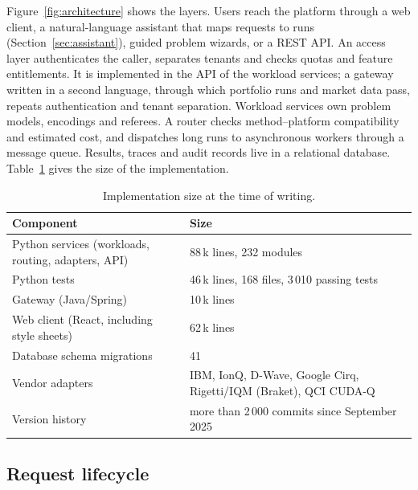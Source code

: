 \documentclass[11pt,a4paper]{article}
\begin{document}
Figure~\ref{fig:architecture} shows the layers. Users reach the platform
through a web client, a natural-language assistant that maps requests to runs
(Section~\ref{sec:assistant}), guided problem wizards, or a REST API. An
access layer authenticates the caller, separates tenants and checks quotas
and feature entitlements. It is implemented in the API of the workload
services; a gateway written in a second language, through which portfolio
runs and market data pass, repeats authentication and tenant separation.
Workload services own problem models, encodings and referees. A
router checks method--platform compatibility and estimated cost, and dispatches
long runs to asynchronous workers through a message queue. Results, traces and
audit records live in a relational database. Table~\ref{tab:codebase} gives the
size of the implementation.

\begin{table}[H]
\centering\small
\begin{tabular}{lp{7.0cm}}
\toprule
Component & Size \\
\midrule
Python services (workloads, routing, adapters, API) & 88\,k lines, 232 modules \\
Python tests & 46\,k lines, 168 files, 3\,010 passing tests \\
Gateway (Java/Spring) & 10\,k lines \\
Web client (React, including style sheets) & 62\,k lines \\
Database schema migrations & 41 \\
Vendor adapters & IBM, IonQ, D-Wave, Google Cirq, Rigetti/IQM (Braket), QCI CUDA-Q \\
Version history & more than 2\,000 commits since September 2025 \\
\bottomrule
\end{tabular}
\caption{Implementation size at the time of writing.}
\label{tab:codebase}
\end{table}

\subsection{Request lifecycle}
\label{sec:lifecycle}
\end{document}
